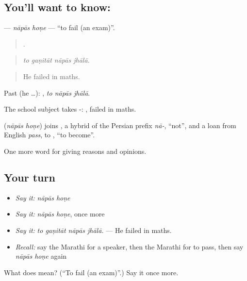 \subsection*{You'll want to know:  }
\textbf{ } — \emph{nāpās hoṇe} — \textquotedblleft{}to fail (an exam)\textquotedblright{}.

\begin{quote}
   .
\end{quote}

\begin{quote}
\emph{to gaṇitāt nāpās jhālā.}
\end{quote}

\begin{quote}
He failed in maths.
\end{quote}

Past (he …):   , \emph{to nāpās jhālā}.

The school subject takes -:  , failed in maths.

\begin{cousinweb}
\textbf{ } (\emph{nāpās hoṇe}) joins , a hybrid of the Persian prefix \emph{nā-}, \textquotedblleft{}not\textquotedblright{}, and a loan from English \emph{pass}, to , \textquotedblleft{}to become\textquotedblright{}.
\end{cousinweb}

\begin{grammarlens}[title={What you've built}]
One more word for giving reasons and opinions.
\end{grammarlens}

\subsection*{Your turn}
\begin{itemize}
\raggedright
  \item \emph{Say it:} \emph{nāpās hoṇe}
  \item \emph{Say it:} \emph{nāpās hoṇe}, once more
  \item \emph{Say it:} \emph{to gaṇitāt nāpās jhālā.} — He failed in maths.
  \item \emph{Recall:} say the Marathi for a speaker, then the Marathi for to pass, then say \emph{nāpās hoṇe} again
\end{itemize}

\begin{tcolorbox}[breakable,colback=teal!4,colframe=teal!35!black,title={Before you move on}]
What does   mean? (\textquotedblleft{}To fail (an exam)\textquotedblright{}.) Say it once more.
\end{tcolorbox}
